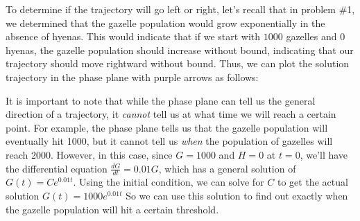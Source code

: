 \documentclass[main]{subfiles}
\begin{document}
\begin{enumerate}
\begin{enumerate}
\begin{enumerate}
\begin{solution}
To determine if the trajectory will go left or right, let's recall that in problem \#1, we determined that the gazelle population would grow exponentially in the absence of hyenas. This would indicate that if we start with $1000$ gazelles and $0$ hyenas, the gazelle population should increase without bound, indicating that our trajectory should move rightward without bound. Thus, we can plot the solution trajectory in the phase plane with purple arrows as follows:

\begin{center}
\end{center}

It is important to note that while the phase plane can tell us the general direction of a trajectory, it \textit{cannot} tell us at what time we will reach a certain point. For example, the phase plane tells us that the gazelle population will eventually hit 1000, but it cannot tell us \textit{when} the population of gazelles will reach 2000. However, in this case, since $G=1000$ and $H=0$ at $t=0$, we'll have the differential equation $\frac{dG}{dt} = 0.01G$, which has a general solution of $G(t)=Ce^{0.01t}$. Using the initial condition, we can solve for $C$ to get the actual solution $G(t)=1000e^{0.01t}$ So we can use this solution to find out exactly when the gazelle population will hit a certain threshold. 


\end{solution}
\end{enumerate}
\end{enumerate}
\end{enumerate}
\end{document}
